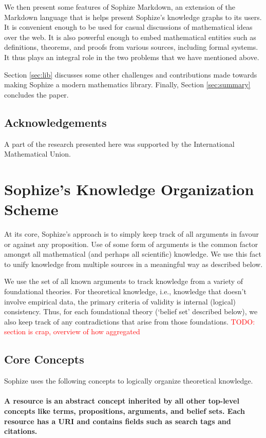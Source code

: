 \documentclass[a4paper]{article}
\newcommand\todo[1]{\textcolor{red}{TODO: #1}}
\begin{document}
We then present some features of Sophize Markdown, an extension of the Markdown language that is helps present Sophize's knowledge graphs to its users. It is convenient enough to be used for casual discussions of mathematical ideas over the web. It is also powerful enough to embed mathematical entities such as definitions, theorems, and proofs from various sources, including formal systems. It thus plays an integral role in the two problems that we have mentioned above.

Section \ref{sec:lib} discusses some other challenges and contributions made towards making Sophize a modern mathematics library. Finally, Section \ref{sec:summary} concludes the paper.


\subsection*{Acknowledgements}
A part of the research presented here was supported by the International Mathematical Union.

\section{Sophize's Knowledge Organization Scheme}
At its core, Sophize's approach is to simply keep track of all arguments in favour or against any proposition. Use of some form of arguments is the common factor amongst all mathematical (and perhaps all scientific) knowledge. We use this fact to unify knowledge from multiple sources in a meaningful way as described below.

We use the set of all known arguments to track knowledge from a variety of foundational theories. For theoretical knowledge, i.e., knowledge that doesn't involve empirical data, the primary criteria of validity is internal (logical) consistency. Thus, for each foundational theory (`belief set' described below), we also keep track of any contradictions that arise from those foundations.
\todo{section is crap, overview of how aggregated}

\subsection{Core Concepts}
Sophize uses the following concepts to logically organize theoretical knowledge.

\paragraph{A \textbf{resource} is an abstract concept inherited by all other top-level concepts like terms, propositions, arguments, and belief sets. Each resource has a URI and contains fields such as search tags and citations.}
\end{document}
